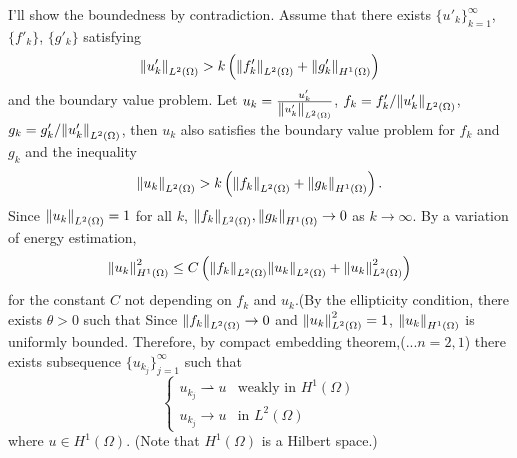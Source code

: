 \documentclass{article}
\begin{document}
I'll show the boundedness by contradiction. Assume that there exists $\{u'_k\}_{k=1}^\infty$, $\{f'_k\}$, $\{g'_k\}$ satisfying
\begin{equation*}
\norm{u'_k}_{L^2(\Omega)}>k\left(\norm{f'_k}_{L^2(\Omega)}+\norm{g'_k}_{H^1(\Omega)}\right)
\end{equation*}
and the boundary value problem. Let $u_k=\frac{u'_k}{\norm{u'_k}_{L^2(\Omega)}}$, $f_k=f'_k/{\norm{u'_k}_{L^2(\Omega)}}$, $g_k=g'_k/{\norm{u'_k}_{L^2(\Omega)}}$, then $u_k$ also satisfies the boundary value problem for $f_k$ and $g_k$ and the inequality
\begin{equation*}
\norm{u_k}_{L^2(\Omega)}>k\left(\norm{f_k}_{L^2(\Omega)}+\norm{g_k}_{H^1(\Omega)}\right).
\end{equation*}
Since $\norm{u_k}_{L^2(\Omega)}=1$ for all $k$, $\norm{f_k}_{L^2(\Omega)}, \norm{g_k}_{H^1(\Omega)}\rightarrow 0$ as $k\rightarrow \infty$. By a variation of energy estimation,
\begin{equation*}
\norm{u_k}^2_{H^1(\Omega)}\leq C\left(\norm{f_k}_{L^2(\Omega)}\norm{u_k}_{L^2(\Omega)}+\norm{u_k}^2_{L^2(\Omega)}\right)
\end{equation*}
for the constant $C$ not depending on $f_k$ and $u_k$.(By the ellipticity condition, there exists $\theta>0$ such that Since $\norm{f_k}_{L^2(\Omega)}\rightarrow 0$ and $\norm{u_k}^2_{L^2(\Omega)}=1$, $\norm{u_k}_{H^1(\Omega)}$ is uniformly bounded. Therefore, by compact embedding theorem,(...$n=2,1$) there exists subsequence $\{u_{k_j}\}_{j=1}^\infty$ such that
\begin{equation*}
\begin{cases}
u_{k_j}\rightharpoonup u & \text{weakly in }H^1(\Omega) \\
u_{k_j}\rightarrow u & \text{in }L^2(\Omega)
\end{cases}
\end{equation*}
where $u\in H^1(\Omega)$. (Note that $H^1(\Omega)$ is a Hilbert space.)
\end{document}
